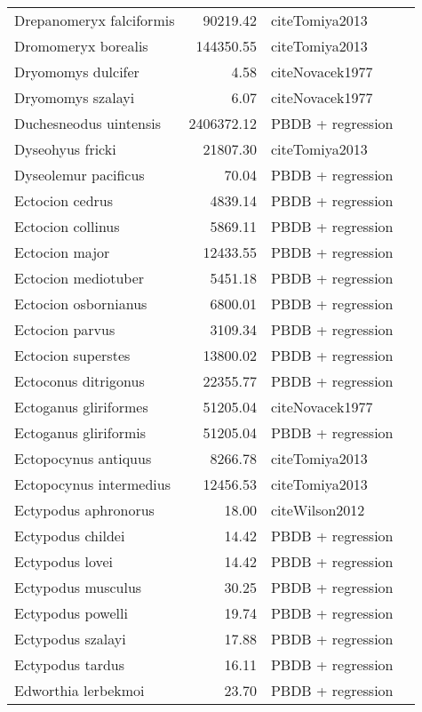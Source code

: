 \begin{table}[ht]
\begin{tabular}{lrll}
  Drepanomeryx falciformis & 90219.42 & cite{Tomiya2013} &  \\ 
  Dromomeryx borealis & 144350.55 & cite{Tomiya2013} &  \\ 
  Dryomomys dulcifer & 4.58 & cite{Novacek1977} &  \\ 
  Dryomomys szalayi & 6.07 & cite{Novacek1977} &  \\ 
  Duchesneodus uintensis & 2406372.12 & PBDB + regression &  \\ 
  Dyseohyus fricki & 21807.30 & cite{Tomiya2013} &  \\ 
  Dyseolemur pacificus & 70.04 & PBDB + regression &  \\ 
  Ectocion cedrus & 4839.14 & PBDB + regression &  \\ 
  Ectocion collinus & 5869.11 & PBDB + regression &  \\ 
  Ectocion major & 12433.55 & PBDB + regression &  \\ 
  Ectocion mediotuber & 5451.18 & PBDB + regression &  \\ 
  Ectocion osbornianus & 6800.01 & PBDB + regression &  \\ 
  Ectocion parvus & 3109.34 & PBDB + regression &  \\ 
  Ectocion superstes & 13800.02 & PBDB + regression &  \\ 
  Ectoconus ditrigonus & 22355.77 & PBDB + regression &  \\ 
  Ectoganus gliriformes & 51205.04 & cite{Novacek1977} &  \\ 
  Ectoganus gliriformis & 51205.04 & PBDB + regression &  \\ 
  Ectopocynus antiquus & 8266.78 & cite{Tomiya2013} &  \\ 
  Ectopocynus intermedius & 12456.53 & cite{Tomiya2013} &  \\ 
  Ectypodus aphronorus & 18.00 & cite{Wilson2012} &  \\ 
  Ectypodus childei & 14.42 & PBDB + regression &  \\ 
  Ectypodus lovei & 14.42 & PBDB + regression &  \\ 
  Ectypodus musculus & 30.25 & PBDB + regression &  \\ 
  Ectypodus powelli & 19.74 & PBDB + regression &  \\ 
  Ectypodus szalayi & 17.88 & PBDB + regression &  \\ 
  Ectypodus tardus & 16.11 & PBDB + regression &  \\ 
  Edworthia lerbekmoi & 23.70 & PBDB + regression &  \\ 

\end{tabular}
\end{table}
